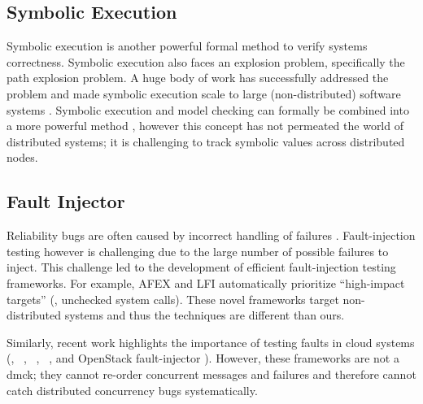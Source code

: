 \subsection{Symbolic Execution}
Symbolic execution is another powerful formal method to verify systems
correctness.  Symbolic execution also faces an explosion problem, specifically
the path explosion problem.  A huge body of work has successfully addressed the
problem and made symbolic execution scale to large (non-distributed) software
systems \cite{Bucur+11-ParallelSymEx, Cadar+08-KLEE, Chipounov+11-S2e,
Cui+13-RuleDirectedSymExec, Zamfir+10-Synthesis}.  Symbolic execution and model
checking can formally be combined into a more powerful
method \cite{Burch+92-SymbolicMC}, however this concept has not permeated the
world of distributed systems; it is challenging to track symbolic values across
distributed nodes.

\subsection{Fault Injector}
Reliability bugs are often caused by incorrect handling of
failures \cite{Gunawi+11-FateDestini, Gunawi+08-EIO}.  Fault-injection testing
however is challenging due to the large number of possible failures to inject.
This challenge led to the development of efficient fault-injection testing
frameworks.  For example, AFEX \cite{Banabic+12-Blackbox} and
LFI \cite{Marinescu+10-ExtensibleLFI} automatically prioritize ``high-impact
targets'' (\eg, unchecked system calls).  These novel frameworks target
non-distributed systems and thus the techniques are different than ours.

Similarly, recent work highlights the importance of testing faults in cloud
systems (\eg, \fate\ \cite{Gunawi+11-FateDestini}, \setsudo\
\cite{Joshi+13-SetsudoTesting}, \prefail\ \cite{Joshi+11-PreFail}, and OpenStack
fault-injector \cite{Ju+13-FaultResOpenStack}). However, these frameworks are
not a dmck; they cannot re-order concurrent messages and failures and therefore
cannot catch distributed concurrency bugs systematically.

